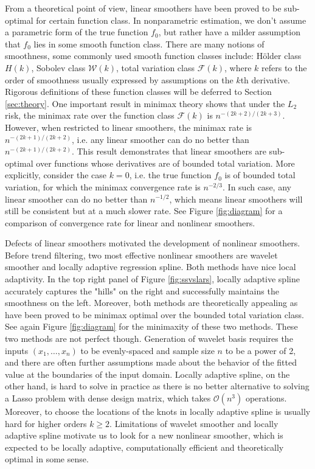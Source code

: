 \documentclass[a4paper]{article}
\renewcommand{\cal}{\mathcal}
\begin{document}
From a theoretical point of view, linear smoothers have been proved to be sub-optimal for certain function class. In nonparametric estimation, we don't assume a parametric form of the true function $f_0$, but rather have a milder assumption that $f_0$ lies in some smooth function class. There are many notions of smoothness, some commonly used smooth function classes include: H\"older class $H(k)$, Sobolev class $\cal{W}(k)$, total variation class $\cal{F}(k)$, where $k$ refers to the order of smoothness usually expressed by assumptions on the $k$th derivative. Rigorous definitions of these function classes will be deferred to Section \ref{sec:theory}. One important result in minimax theory shows that under the $L_2$ risk, the minimax rate over the function class $\cal{F}(k)$ is $n^{-(2k+2)/(2k+3)}$\cite{donoho1998minimax}. However, when restricted to linear smoothers, the minimax rate is $n^{-(2k+1)/(2k+2)}$, i.e. any linear smoother can do no better than $n^{-(2k+1)/(2k+2)}$. This result demonstrates that linear smoothers are sub-optimal over functions whose derivatives are of bounded total variation. More explicitly, consider the case $k = 0$, i.e. the true function $f_0$ is of bounded total variation, for which the minimax convergence rate is $n^{-2/3}$. In such case, any linear smoother can do no better than $n^{-1/2}$, which means linear smoothers will still be consistent but at a much slower rate. See Figure \ref{fig:diagram} for a comparison of convergence rate for linear and nonlinear smoothers.

Defects of linear smoothers motivated the development of nonlinear smoothers. Before trend filtering, two most effective nonlinear smoothers are wavelet smoother\cite{johnstone2011gaussian,mallat2008wavelet,donoho1994ideal} and locally adaptive regression spline\cite{mammen1997locally}. Both methods have nice local adaptivity. In the top right panel of Figure \ref{fig:ssvslars}, locally adaptive spline accurately captures the "hills" on the right and successfully maintains the smoothness on the left. Moreover, both methods are theoretically appealing as have been proved to be minimax optimal over the bounded total variation class\cite{donoho1998minimax,mammen1997locally}. See again Figure \ref{fig:diagram} for the minimaxity of these two methods. These two methods are not perfect though. Generation of wavelet basis requires the inputs $(x_1, \ldots, x_n)$ to be evenly-spaced and sample size $n$ to be a power of 2, and there are often further assumptions made about the behavior of the fitted value at the boundaries of the input domain. Locally adaptive spline, on the other hand, is hard to solve in practice as there is no better alternative to solving a Lasso problem with dense design matrix, which takes $\cal{O}(n^3)$ operations. Moreover, to choose the locations of the knots in locally adaptive spline is usually hard for higher orders $k\geq 2$. Limitations of wavelet smoother and locally adaptive spline motivate us to look for a new nonlinear smoother, which is expected to be locally adaptive, computationally efficient and theoretically optimal in some sense.
\end{document}
